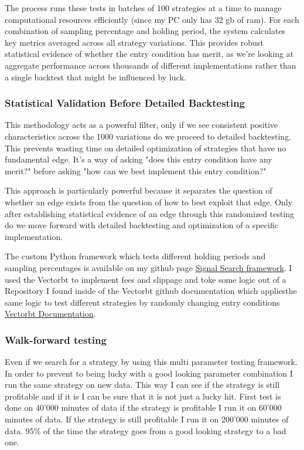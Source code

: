 \documentclass[12pt]{article}
\begin{document}
The process runs these tests in batches of 100 strategies at a time to manage computational resources efficiently (since my PC only has 32 gb of ram). For each combination of sampling percentage and holding period, the system calculates key metrics averaged across all strategy variations. This provides robust statistical evidence of whether the entry condition has merit, as we're looking at aggregate performance across thousands of different implementations rather than a single backtest that might be influenced by luck.

\subsubsection*{Statistical Validation Before Detailed Backtesting}
This methodology acts as a powerful filter, only if we see consistent positive characteristics across the 1000 variations do we proceed to detailed backtesting. This prevents wasting time on detailed optimization of strategies that have no fundamental edge. It's a way of asking "does this entry condition have any merit?" before asking "how can we best implement this entry condition?"

This approach is particularly powerful because it separates the question of whether an edge exists from the question of how to best exploit that edge. Only after establishing statistical evidence of an edge through this randomized testing do we move forward with detailed backtesting and optimization of a specific implementation.

The custom Python framework which tests different holding periods and sampling percentages is available on my github page \href{https://github.com/AJslashTracey/signal_search_strategy}{Signal Search framework}. I used the Vectorbt to implement fees and slippage and toke some logic out of a Repository I found inside of the Vectorbt github documentation which appliesthe same logic to test different strategies by randomly changing entry conditions \href{https://github.com/polakowo/vectorbt}{Vectorbt Documentation}.


\subsubsection*{Walk-forward testing}
Even if we search for a strategy by using this multi parameter testing framework. In order to prevent to being lucky with a good looking parameter combination I run the same strategy on new data. This way I can see if the strategy is still profitable and if it is I can be sure that it is not just a lucky hit.
First test is done on 40'000 minutes of data if the strategy is profitable I run it on 60'000 minutes of data. If the strategy is still profitable I run it on 200'000 minutes of data. 95\% of the time the strategy goes from a good looking strategy to a bad one.
\end{document}
